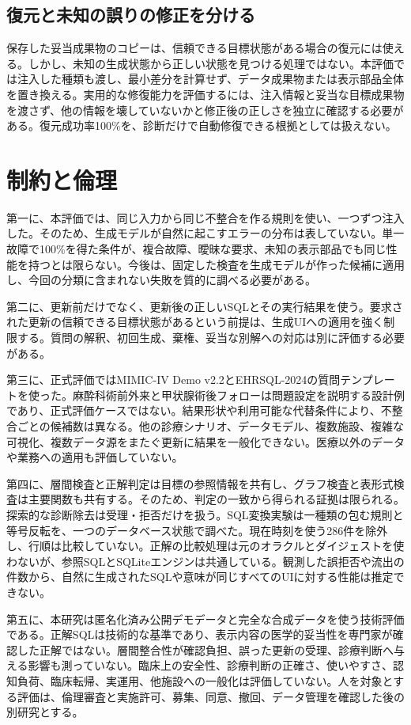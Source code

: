\documentclass[manuscript,review,anonymous]{acmart}
\begin{document}
\subsection{復元と未知の誤りの修正を分ける}

保存した妥当成果物のコピーは、信頼できる目標状態がある場合の復元には使える。しかし、未知の生成状態から正しい状態を見つける処理ではない。本評価では注入した種類も渡し、最小差分を計算せず、データ成果物または表示部品全体を置き換える。実用的な修復能力を評価するには、注入情報と妥当な目標成果物を渡さず、他の情報を壊していないかと修正後の正しさを独立に確認する必要がある。復元成功率100\%を、診断だけで自動修復できる根拠としては扱えない。

\section{制約と倫理}

第一に、本評価では、同じ入力から同じ不整合を作る規則を使い、一つずつ注入した。そのため、生成モデルが自然に起こすエラーの分布は表していない。単一故障で100\%を得た条件が、複合故障、曖昧な要求、未知の表示部品でも同じ性能を持つとは限らない。今後は、固定した検査を生成モデルが作った候補に適用し、今回の分類に含まれない失敗を質的に調べる必要がある。

第二に、更新前だけでなく、更新後の正しいSQLとその実行結果を使う。要求された更新の信頼できる目標状態があるという前提は、生成UIへの適用を強く制限する。質問の解釈、初回生成、棄権、妥当な別解への対応は別に評価する必要がある。

第三に、正式評価ではMIMIC-IV Demo v2.2とEHRSQL-2024の質問テンプレートを使った。麻酔科術前外来と甲状腺術後フォローは問題設定を説明する設計例であり、正式評価ケースではない。結果形状や利用可能な代替条件により、不整合ごとの候補数は異なる。他の診療シナリオ、データモデル、複数施設、複雑な可視化、複数データ源をまたぐ更新に結果を一般化できない。医療以外のデータや業務への適用も評価していない。

第四に、層間検査と正解判定は目標の参照情報を共有し、グラフ検査と表形式検査は主要関数も共有する。そのため、判定の一致から得られる証拠は限られる。探索的な診断除去は受理・拒否だけを扱う。SQL変換実験は一種類の包む規則と等号反転を、一つのデータベース状態で調べた。現在時刻を使う286件を除外し、行順は比較していない。正解の比較処理は元のオラクルとダイジェストを使わないが、参照SQLとSQLiteエンジンは共通している。観測した誤拒否や流出の件数から、自然に生成されたSQLや意味が同じすべてのUIに対する性能は推定できない。

第五に、本研究は匿名化済み公開デモデータと完全な合成データを使う技術評価である。正解SQLは技術的な基準であり、表示内容の医学的妥当性を専門家が確認した正解ではない。層間整合性が確認負担、誤った更新の受理、診療判断へ与える影響も測っていない。臨床上の安全性、診療判断の正確さ、使いやすさ、認知負荷、臨床転帰、実運用、他施設への一般化は評価していない。人を対象とする評価は、倫理審査と実施許可、募集、同意、撤回、データ管理を確認した後の別研究とする。
\end{document}
